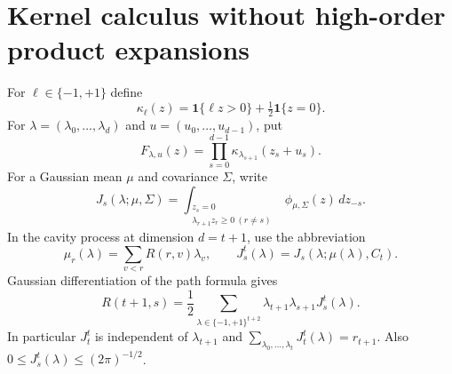 \documentclass[11pt]{article}
\theoremstyle{remark}\newtheorem{remark}[theorem]{Remark}
\newcommand{\one}{\mathbf 1}
\begin{document}
\section{Kernel calculus without high-order product expansions}
For $\ell\in\{-1,+1\}$ define
\[
 \kappa_\ell(z)=\one\{\ell z>0\}+\tfrac12\one\{z=0\}.
\]
For $\lambda=(\lambda_0,\ldots,\lambda_d)$ and $u=(u_0,\ldots,u_{d-1})$,
put
\[
 F_{\lambda,u}(z)=\prod_{s=0}^{d-1}\kappa_{\lambda_{s+1}}(z_s+u_s).
\]
For a Gaussian mean $\mu$ and covariance $\Sigma$, write
\[
 J_s(\lambda;\mu,\Sigma)
 =\int_{\substack{z_s=0\\\lambda_{r+1}z_r\ge0\ (r\ne s)}}
             \phi_{\mu,\Sigma}(z)\,dz_{-s}.
\]
In the cavity process at dimension $d=t+1$, use the abbreviation
\[
 \mu_r(\lambda)=\sum_{v<r}R(r,v)\lambda_v,\qquad
 J_s^t(\lambda)=J_s(\lambda;\mu(\lambda),C_t).
\]
Gaussian differentiation of the path formula gives
\begin{equation}\label{eq:response-face-identity}
 R(t+1,s)=\frac12\sum_{\lambda\in\{-1,+1\}^{t+2}}
          \lambda_{t+1}\lambda_{s+1}J_s^t(\lambda).
\end{equation}
In particular $J_t^t$ is independent of $\lambda_{t+1}$ and
$\sum_{\lambda_0,\ldots,\lambda_t}J_t^t(\lambda)=r_{t+1}$.
Also $0\le J_s^t(\lambda)\le(2\pi)^{-1/2}$.
\end{document}
